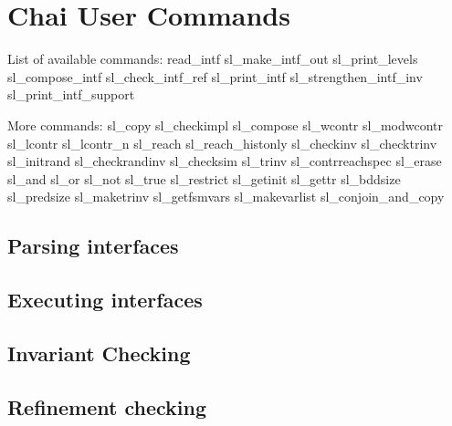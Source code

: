 \chapter {Chai User Commands}
\label{sec:chaicommands}
\label{chap:chaicommands}

List of available commands:
read_intf 
sl_make_intf_out
sl_print_levels
sl_compose_intf
sl_check_intf_ref
sl_print_intf
sl_strengthen_intf_inv
sl_print_intf_support

More commands:
sl_copy
sl_checkimpl
sl_compose
sl_wcontr
sl_modwcontr
sl_lcontr
sl_lcontr_n
sl_reach
sl_reach_histonly
sl_checkinv
sl_checktrinv
sl_initrand
sl_checkrandinv
sl_checksim
sl_trinv
sl_contrreachspec
sl_erase
sl_and
sl_or
sl_not
sl_true
sl_restrict
sl_getinit
sl_gettr
sl_bddsize
sl_predsize
sl_maketrinv
sl_getfsmvars
sl_makevarlist
sl_conjoin_and_copy

       
\section{Parsing interfaces}
\label{sec:parsing-interfaces}
\section{Executing interfaces}
\label{subsec:execution}
\section{Invariant Checking}
\section{Refinement checking}

